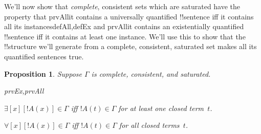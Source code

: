 \documentclass[10pt,a4paper]{article}
\theoremstyle{plain}
\newtheorem{prop}[thm]{Proposition}
\theoremstyle{definition}
\theoremstyle{remark}
\newenvironment{explain}{}{}
\newcommand*{\ollabel}[1]{\label{#1}}
\providecommand{\lforall}{\mathord{\forall}}
\providecommand{\lexists}{\mathord{\exists}}
\providecommand{\iftag}[1]{#1}
\providecommand{\tagitem}[1]{\item[#1]}
\begin{document}
\begin{explain}
We'll now show that \emph{complete}, consistent sets which are
saturated have the property that \iftag{prvAll}{it contains a
  universally quantified !!{sentence} iff it contains all its
  instances}{}\iftag{defAll,defEx}{}{ and }\iftag{prvAll}{it contains an
  existentially quantified !!{sentence} iff it contains at least one
  instance}{}. We'll use this to show that the !!{structure} we'll
generate from a complete, consistent, saturated set makes all its
quantified sentences true.
\end{explain}

\begin{prop}\ollabel{prop:saturated-instances}
Suppose $\Gamma$ is complete, consistent, and saturated.
\begin{tagenumerate}{prvEx,prvAll}
\tagitem{prvEx}{$\lexists[x][!A(x)] \in \Gamma$ iff $!A(t) \in \Gamma$
  for at least one closed term~$t$.}{}
\tagitem{prvAll}{$\lforall[x][!A(x)] \in \Gamma$ iff $!A(t) \in \Gamma$
  for all closed terms~$t$.}{}
\end{tagenumerate}
\end{prop}
\end{document}
